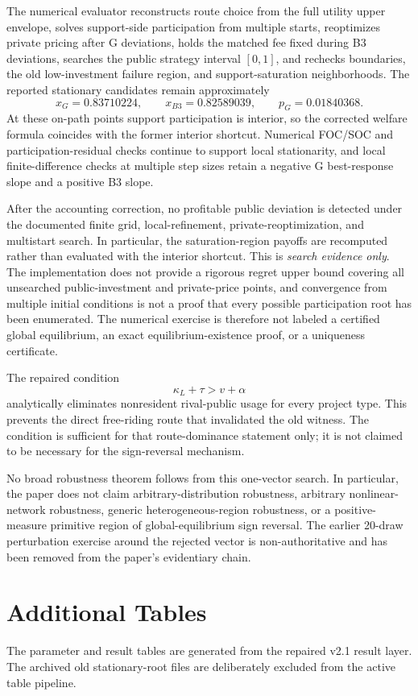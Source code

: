 The numerical evaluator reconstructs route choice from the full utility upper envelope, solves support-side participation from multiple starts, reoptimizes private pricing after G deviations, holds the matched fee fixed during B3 deviations, searches the public strategy interval $[0,1]$, and rechecks boundaries, the old low-investment failure region, and support-saturation neighborhoods. The reported stationary candidates remain approximately
\[
x_G=0.83710224,
\qquad
x_{B3}=0.82589039,
\qquad
p_G=0.01840368.
\]
At these on-path points support participation is interior, so the corrected welfare formula coincides with the former interior shortcut. Numerical FOC/SOC and participation-residual checks continue to support local stationarity, and local finite-difference checks at multiple step sizes retain a negative G best-response slope and a positive B3 slope.

After the accounting correction, no profitable public deviation is detected under the documented finite grid, local-refinement, private-reoptimization, and multistart search. In particular, the saturation-region payoffs are recomputed rather than evaluated with the interior shortcut. This is \emph{search evidence only}. The implementation does not provide a rigorous regret upper bound covering all unsearched public-investment and private-price points, and convergence from multiple initial conditions is not a proof that every possible participation root has been enumerated. The numerical exercise is therefore not labeled a certified global equilibrium, an exact equilibrium-existence proof, or a uniqueness certificate.

The repaired condition
\[
\kappa_L+\tau>v+\alpha
\]
analytically eliminates nonresident rival-public usage for every project type. This prevents the direct free-riding route that invalidated the old witness. The condition is sufficient for that route-dominance statement only; it is not claimed to be necessary for the sign-reversal mechanism.

No broad robustness theorem follows from this one-vector search. In particular, the paper does not claim arbitrary-distribution robustness, arbitrary nonlinear-network robustness, generic heterogeneous-region robustness, or a positive-measure primitive region of global-equilibrium sign reversal. The earlier 20-draw perturbation exercise around the rejected vector is non-authoritative and has been removed from the paper's evidentiary chain.

\section{Additional Tables}\label{app:tables}
\begin{table}[h]
\centering
\caption{Repaired baseline parameters}
\label{tab:parameters}

\end{table}

The parameter and result tables are generated from the repaired v2.1 result layer. The archived old stationary-root files are deliberately excluded from the active table pipeline.

